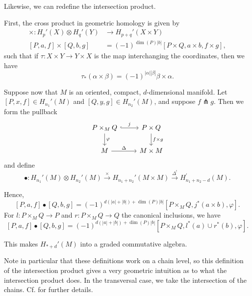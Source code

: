 \documentclass[reqno]{amsart}
\theoremstyle{definition}
\theoremstyle{remark}
\begin{document}
Likewise, we can redefine the intersection product.

First, the cross product in geometric homology is given
by
\begin{align*}
    \times \colon H_p'(X) \otimes H_q'(Y)
    &\to H_{p+q}'(X \times Y)\\
    \left[ P,a,f \right] \times \left[ Q,b,g \right] 
    &= (-1)^{\dim (P) \left| b \right| }
    \left[ P \times Q , a \times b, f \times g \right],
\end{align*}
such that
if $\tau \colon X \times Y \to Y \times X$ is the
map interchanging the coordinates, then we have
\[
\tau_* \left( \alpha \times \beta \right) = 
\left( -1 \right)^{\left| \alpha \right| \left| \beta \right| }
\beta \times \alpha .
\] 

Suppose now that $M$ is an oriented, compact, $d$-dimensional
manifold. Let
$\left[ P,x,f \right] \in H_{n_1}'(M)$ and
$\left[ Q,y,g \right] \in H_{n_2}'(M)$, and suppose
$f \pitchfork g$.
Then we form the pullback
\begin{equation*}
\begin{tikzcd}
    P \times_{M} Q \ar[r, "j", hookrightarrow] \ar[d, "\varphi "] & 
    P \times Q \ar[d, "f \times g"] \\
    M \ar[r, "\Delta"] & M \times M
\end{tikzcd}
\end{equation*}
and define
\[
\bullet \colon H_{n_1}'(M) \otimes H_{n_2}'(M) 
\stackrel{\times }{\to} H_{n_1+n_2}'(M \times M) 
\stackrel{\Delta^{!}}{\to} H_{n_1+n_2-d}^{'}(M).
\] 

Hence, 
\[
\left[ P,a,f \right] \bullet \left[ Q,b,g \right] = 
(-1)^{d \left( \left| a \right| + \left| b \right|  \right) +
\dim (P) \left| b \right| }
\left[ P \times_M Q, j^{*}\left( a \times b \right) ,\varphi  \right] .
\] 
For $l \colon P \times_M Q \to P$ and $r \colon P \times_M Q \to Q$ the
canonical inclusions, we have
\[
\left[ P, a, f \right] \bullet
\left[ Q, b, g \right] = 
(-1)^{d \left( \left| a \right| + \left| b \right|  \right) +
\dim(P) \left| b \right| }
\left[ P \times_M Q, l^{*}(a) \cup r^{*}(b), \varphi  \right] . 
\] 

This makes $H_{*+d}'(M)$ into a graded commutative algebra.

Note in particular that these definitions work on a chain level,
so this definition of the intersection product gives
a very geometric intuition as to what the intersection product does.
In the transversal case, we take the intersection of the chains.
Cf. \cite{Chataur} for further details.
\end{document}
